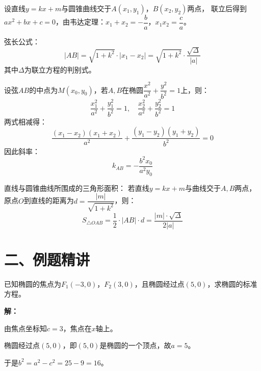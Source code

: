 \documentclass[12pt, a4paper]{ctexart}
\begin{document}
\vspace{4pt}

\begin{knowledgebox}[弦长公式]
设直线$y = kx + m$与圆锥曲线交于$A(x_1, y_1)$，$B(x_2, y_2)$两点，
联立后得到$ax^2 + bx + c = 0$，由韦达定理：$x_1 + x_2 = -\dfrac{b}{a}$，$x_1 x_2 = \dfrac{c}{a}$。

弦长公式：
\[|AB| = \sqrt{1 + k^2} \cdot |x_1 - x_2| = \sqrt{1 + k^2} \cdot \frac{\sqrt{\Delta}}{|a|}\]
其中$\Delta$为联立方程的判别式。
\end{knowledgebox}

\vspace{4pt}

\begin{knowledgebox}
设弦$AB$的中点为$M(x_0, y_0)$，若$A, B$在椭圆$\dfrac{x^2}{a^2} + \dfrac{y^2}{b^2} = 1$上，则：
\[\frac{x_1^2}{a^2} + \frac{y_1^2}{b^2} = 1, \quad \frac{x_2^2}{a^2} + \frac{y_2^2}{b^2} = 1\]
两式相减得：
\[\frac{(x_1 - x_2)(x_1 + x_2)}{a^2} + \frac{(y_1 - y_2)(y_1 + y_2)}{b^2} = 0\]
因此斜率：
\[k_{AB} = -\frac{b^2 x_0}{a^2 y_0}\]
\end{knowledgebox}

\begin{tipbox}[面积公式]
直线与圆锥曲线所围成的三角形面积：
若直线$y = kx + m$与曲线交于$A, B$两点，原点$O$到直线的距离为$d = \dfrac{|m|}{\sqrt{1+k^2}}$，则：
\[S_{\triangle OAB} = \frac{1}{2} \cdot |AB| \cdot d = \frac{|m| \cdot \sqrt{\Delta}}{2|a|}\]
\end{tipbox}

\newpage

\section*{\textcolor{examorange}{二、例题精讲}}

\begin{examplebox}[【例题1】求椭圆标准方程]
已知椭圆的焦点为$F_1(-3, 0)$，$F_2(3, 0)$，且椭圆经过点$(5, 0)$，求椭圆的标准方程。
\end{examplebox}

\textbf{解：}

由焦点坐标知$c = 3$，焦点在$x$轴上。

椭圆经过点$(5, 0)$，即$(5, 0)$是椭圆的一个顶点，故$a = 5$。

于是$b^2 = a^2 - c^2 = 25 - 9 = 16$。
\end{document}
